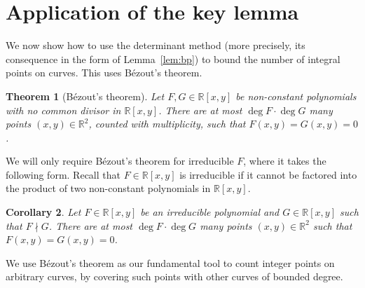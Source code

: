 \documentclass[12pt]{amsart}
\newcommand{\R}{{\mathbb R}}
\newcommand{\1}{{\mathbf 1}}
\newtheorem{theorem}{Theorem}
\newtheorem{corollary}[theorem]{Corollary}
\theoremstyle{remark}
\theoremstyle{definition}
\begin{document}
\section{Application of the key lemma}\label{sec-app}
We now show how to use the determinant method (more precisely, its consequence in the form of Lemma~\ref{lem:bp}) to bound the number of integral points on curves. This uses B\'ezout's theorem.
\begin{theorem}[B\'ezout's theorem]
Let $F,G\in \mathbb{R}[x,y]$ be non-constant polynomials with no common divisor in $\mathbb{R}[x,y]$. There are at most $\deg F\cdot \deg G$ many points $(x,y)\in \mathbb{R}^2$, counted with multiplicity, such that $F(x,y)=G(x,y)=0$.
\end{theorem}
We will only require B\'ezout's theorem for irreducible $F$, where it takes the following form. Recall that $F\in \mathbb{R}[x,y]$ is irreducible if it cannot be factored into the product of two non-constant polynomials in $\mathbb{R}[x,y]$.
\begin{corollary}\label{cor:Bzout}
Let $F\in \R[x,y]$ be an irreducible polynomial and $G\in \R[x,y]$ such that $F\nmid G$. There are at most $\deg F\cdot \deg G$ many points $(x,y)\in \R^2$ such that $F(x,y)=G(x,y)=0$.
\end{corollary}

We use B\'ezout's theorem as our fundamental tool to count integer points on arbitrary curves, by covering such points with other curves of bounded degree.
\end{document}
